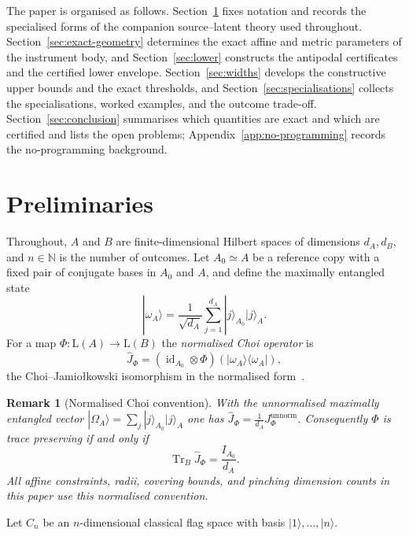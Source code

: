 \documentclass[11pt,a4paper]{article}
\newtheorem{remark}[theorem]{Remark}
\newcommand{\Lin}{\mathrm{L}}
\newcommand{\Tr}{\operatorname{Tr}}
\newcommand{\id}{\operatorname{id}}
\newcommand{\Jhat}{\widehat J}
\begin{document}
The paper is organised as follows. Section~\ref{sec:prelim} fixes notation and records the specialised forms of the companion source--latent theory used throughout. Section~\ref{sec:exact-geometry} determines the exact affine and metric parameters of the instrument body, and Section~\ref{sec:lower} constructs the antipodal certificates and the certified lower envelope. Section~\ref{sec:widths} develops the constructive upper bounds and the exact thresholds, and Section~\ref{sec:specialisations} collects the specialisations, worked examples, and the outcome trade-off. Section~\ref{sec:conclusion} summarises which quantities are exact and which are certified and lists the open problems; Appendix~\ref{app:no-programming} records the no-programming background.

\section{Preliminaries}
\label{sec:prelim}

Throughout, $A$ and $B$ are finite-dimensional Hilbert spaces of dimensions $d_A,d_B$, and $n\in\mathbb N$ is the number of outcomes. Let $A_0\simeq A$ be a reference copy with a fixed pair of conjugate bases in $A_0$ and $A$, and define the maximally entangled state
\[
|\omega_A\rangle=\frac1{\sqrt{d_A}}\sum_{j=1}^{d_A}|j\rangle_{A_0}|j\rangle_A.
\]
For a map $\Phi:\Lin(A)\to\Lin(B)$ the \emph{normalised Choi operator} is
\[
\Jhat_\Phi=(\id_{A_0}\otimes\Phi)(|\omega_A\rangle\langle\omega_A|),
\]
the Choi--Jamio{\l}kowski isomorphism in the normalised form~\cite{Choi1975,Jamiolkowski1972}.

\begin{remark}[Normalised Choi convention]
\label{rem:choi-convention}
With the unnormalised maximally entangled vector $|\Omega_A\rangle=\sum_j|j\rangle_{A_0}|j\rangle_A$ one has $\Jhat_\Phi=\tfrac1{d_A}J_\Phi^{\mathrm{unnorm}}$. Consequently $\Phi$ is trace preserving if and only if
\[
\Tr_B\Jhat_\Phi=\frac{I_{A_0}}{d_A}.
\]
All affine constraints, radii, covering bounds, and pinching dimension counts in this paper use this normalised convention.
\end{remark}

Let $C_n$ be an $n$-dimensional classical flag space with basis $|1\rangle,\dots,|n\rangle$.
\end{document}
